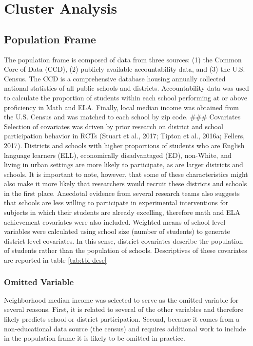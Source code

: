\documentclass[floatsintext,man]{apa6}
\theoremstyle{definition}
\theoremstyle{definition}
\theoremstyle{definition}
\theoremstyle{remark}
\begin{document}
\section{Cluster Analysis}\label{cluster-analysis}

\subsection{Population Frame}\label{population-frame}

The population frame is composed of data from three sources: (1) the
Common Core of Data (CCD), (2) publicly available accountability data,
and (3) the U.S. Census. The CCD is a comprehensive database housing
annually collected national statistics of all public schools and
districts. Accountability data was used to calculate the proportion of
students within each school performing at or above proficiency in Math
and ELA. Finally, local median income was obtained from the U.S. Census
and was matched to each school by zip code. \#\#\# Covariates Selection
of covariates was driven by prior research on district and school
participation behavior in RCTs (Stuart et al., 2017; Tipton et al.,
2016a; Fellers, 2017). Districts and schools with higher proportions of
students who are English language learners (ELL), economically
disadvantaged (ED), non-White, and living in urban settings are more
likely to participate, as are larger districts and schools. It is
important to note, however, that some of these characteristics might
also make it more likely that researchers would recruit these districts
and schools in the first place. Anecdotal evidence from several research
teams also suggests that schools are less willing to participate in
experimental interventions for subjects in which their students are
already excelling, therefore math and ELA achievement covariates were
also included. Weighted means of school level variables were calculated
using school size (number of students) to generate district level
covariates. In this sense, district covariates describe the population
of students rather than the population of schools. Descriptives of these
covariates are reported in table \ref{tab:tbl-desc}

\subsubsection{Omitted Variable}\label{omitted-variable}

Neighborhood median income was selected to serve as the omitted variable
for several reasons. First, it is related to several of the other
variables and therefore likely predicts school or district
participation. Second, because it comes from a non-educational data
source (the census) and requires additional work to include in the
population frame it is likely to be omitted in practice.
\end{document}
